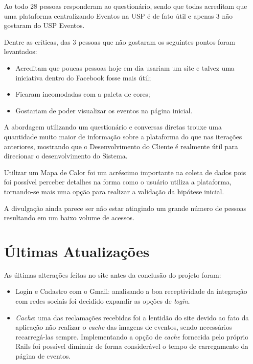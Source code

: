 \par Ao todo 28 pessoas responderam ao questionário, sendo que todas acreditam que uma plataforma centralizando Eventos na USP é de fato útil e  apenas 3 não gostaram do USP Eventos.
\par Dentre as críticas, das 3 pessoas que não gostaram os seguintes pontos foram levantados:
\begin{itemize}
\item Acreditam que poucas pessoas hoje em dia usariam um site e talvez uma iniciativa dentro do Facebook fosse mais útil;
\item Ficaram incomodadas com a paleta de cores;
\item Gostariam de poder visualizar os eventos na página inicial.
\end{itemize}

\par A abordagem utilizando um questionário e conversas diretas trouxe uma quantidade muito maior de informação sobre a plataforma do que nas iterações anteriores, mostrando que o Desenvolvimento do Cliente é realmente útil para direcionar o desenvolvimento do Sistema.
\par Utilizar um Mapa de Calor foi um acréscimo importante na coleta de dados pois foi possível perceber detalhes na forma como o usuário utiliza a plataforma, tornando-se mais uma opção para realizar a validação da hipótese inicial.
\par A divulgação ainda parece ser não estar atingindo um grande número de pessoas resultando em um baixo volume de acessos.

\section{Últimas Atualizações}
\par As últimas alterações feitas no site antes da conclusão do projeto foram:
\begin{itemize}
\item Login e Cadastro com o Gmail: analisando a boa receptividade da integração com redes sociais foi decidido expandir as opções de \emph{login}.
\item \emph{Cache}: uma das reclamações recebidas foi a lentidão do site devido ao fato da aplicação não realizar o \emph{cache} das imagens de eventos, sendo necessários recarregá-las sempre. Implementando a opção de \emph{cache} fornecida pelo próprio Rails foi possível diminuir de forma considerável o tempo de carregamento da página de eventos.
\end{itemize}
